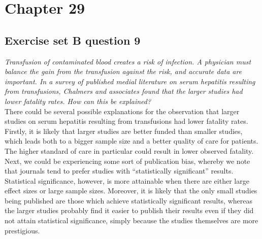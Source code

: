 \documentclass[11pt]{article}
\begin{document}
\section*{Chapter 29}


\subsection*{Exercise set B question 9} %
\textit{Transfusion of contaminated blood creates a risk of infection. A physician must balance the gain from the transfusion against the risk, and accurate data are important. In a survey of published medial literature on serum hepatitis resulting from transfusions, Chalmers and associates found that the larger studies had lower fatality rates. How can this be explained?}\\

There could be several possible explanations for the observation that larger studies on serum hepatitis resulting from transfusions had lower fatality rates. Firstly, it is likely that larger studies are better funded than smaller studies, which leads both to a bigger sample size and a better quality of care for patients. The higher standard of care in particular could result in lower observed fatality. Next, we could be experiencing some sort of publication bias, whereby we note that journals tend to prefer studies with ``statistically significant'' results. Statistical significance, however, is more attainable when there are either large effect sizes or large sample sizes. Moreover, it is likely that the only small studies being published are those which achieve statistically significant results, whereas the larger studies probably find it easier to publish their results even if they did not attain statistical significance, simply because the studies themselves are more prestigious.
%
\end{document}
